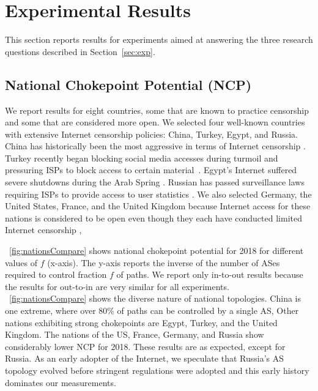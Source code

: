 \section{Experimental Results}

This section reports results for experiments aimed at
answering the three research questions described in Section~\ref{sec:exp}. 

\subsection{National Chokepoint Potential (NCP)} 

We report results for eight countries, some that are known to practice censorship and some that are considered more open.
We selected four well-known countries with
extensive Internet censorship policies: China, Turkey,
Egypt, and Russia. China has historically been the most aggressive in terms of
Internet censorship \cite{censorshipSurvey}. Turkey recently
began blocking social media
accesses during turmoil and pressuring ISPs to block access to certain material~\cite{turkeyCensor}. Egypt's Internet suffered
severe shutdowns during the Arab Spring \cite{arabspring}.
Russian has passed surveillance laws requiring ISPs to provide access to user statistics \cite{censorshipGeography}. 
We also selected Germany, the United States, France, and the
United Kingdom because Internet access for these nations is
considered to be open even though they each have conducted limited Internet
censorship \cite{censorshipSurvey}, 
	
\figurename~\ref{fig:nationsCompare} shows national chokepoint
potential for 2018 for different values of $f$ (x-axis). The
y-axis reports the inverse of the number of ASes required to control fraction $f$ of
paths. We report only in-to-out results
because the results for out-to-in are very similar
for all experiments.  \figurename~\ref{fig:nationsCompare} shows the diverse nature of national topologies. China is one
extreme, where over 80\% of paths can be controlled by a single AS,
Other nations exhibiting strong chokepoints are Egypt, Turkey, and the United Kingdom. The
nations of the US, France, Germany, and Russia show considerably lower NCP for 2018.  These results are as expected, except for Russia. As an early adopter of the Internet, we speculate that Russia's AS topology evolved before stringent regulations were adopted and this early history dominates our measurements.  



